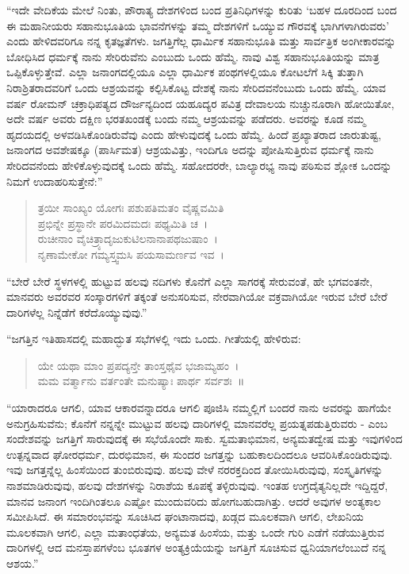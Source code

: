“ಇದೇ ವೇದಿಕೆಯ ಮೇಲೆ ನಿಂತು, ಪೌರಾತ್ಯ ದೇಶಗಳಿಂದ ಬಂದ ಪ್ರತಿನಿಧಿಗಳನ್ನು ಕುರಿತು ‘ಬಹಳ ದೂರದಿಂದ ಬಂದ ಈ ಮಹಾನೀಯರು ಸಹಾನುಭೂತಿಯ ಭಾವನೆಗಳನ್ನು ತಮ್ಮ ದೇಶಗಳಿಗೆ ಒಯ್ಯುವ ಗೌರವಕ್ಕೆ ಭಾಗಿಗಳಾಗಿರುವರು’ ಎಂದು ಹೇಳಿದವರಿಗೂ ನನ್ನ ಕೃತಜ್ಞತೆಗಳು. ಜಗತ್ತಿಗೆಲ್ಲ ಧಾರ್ಮಿಕ ಸಹಾನುಭೂತಿ ಮತ್ತು ಸಾರ್ವತ್ರಿಕ ಅಂಗೀಕಾರವನ್ನು ಬೋಧಿಸಿದ ಧರ್ಮಕ್ಕೆ ನಾನು ಸೇರಿರುವೆನು ಎಂಬುದು ಒಂದು ಹೆಮ್ಮೆ. ನಾವು ವಿಶ್ವ ಸಹಾನುಭೂತಿಯನ್ನು ಮಾತ್ರ ಒಪ್ಪಿಕೊಳ್ಳುತ್ತೇವೆ. ಎಲ್ಲಾ ಜನಾಂಗದಲ್ಲಿಯೂ ಎಲ್ಲಾ ಧಾರ್ಮಿಕ ಪಂಥಗಳಲ್ಲಿಯೂ ಕೋಟಲೆಗೆ ಸಿಕ್ಕಿ ತುತ್ತಾಗಿ ನಿರಾಶ್ರಿತರಾದವರಿಗೆ ಒಂದು ಆಶ್ರಯವನ್ನು ಕಲ್ಪಿಸಿಕೊಟ್ಟ ದೇಶಕ್ಕೆ ನಾನು ಸೇರಿದವನೆಂಬುದು ಒಂದು ಹೆಮ್ಮೆ. ಯಾವ ವರ್ಷ ರೋಮನ್ ಚಕ್ರಾಧಿಪತ್ಯದ ದೌರ್ಜನ್ಯದಿಂದ ಯಹೂದ್ಯರ ಪವಿತ್ರ ದೇವಾಲಯ ನುಚ್ಚುನೂರಾಗಿ ಹೋಯಿತೋ, ಅದೇ ವರ್ಷ ಅವರು ದಕ್ಷಿಣ ಭರತಖಂಡಕ್ಕೆ ಬಂದು ನಮ್ಮ ಆಶ್ರಯವನ್ನು ಪಡೆದರು. ಅವರನ್ನು ಕೂಡ ನಮ್ಮ ಹೃದಯದಲ್ಲಿ ಅಳವಡಿಸಿಕೊಂಡಿರುವೆವು ಎಂದು ಹೇಳುವುದಕ್ಕೆ ಒಂದು ಹೆಮ್ಮೆ. ಹಿಂದೆ ಪ್ರಖ್ಯಾತರಾದ ಜಾರುತುಷ್ಟ, ಜನಾಂಗದ ಅವಶೇಷಕ್ಕೂ (ಪಾರ್ಸಿಮತ) ಆಶ್ರಯವಿತ್ತು, ಇಂದಿಗೂ ಅದನ್ನು ಪೋಷಿಸುತ್ತಿರುವ ಧರ್ಮಕ್ಕೆ ನಾನು ಸೇರಿದವನೆಂದು ಹೇಳಿಕೊಳ್ಳುವುದಕ್ಕೆ ಒಂದು ಹೆಮ್ಮೆ. ಸಹೋದರರೇ, ಬಾಲ್ಯಾರಭ್ಯ ನಾವು ಪಠಿಸುವ ಶ್ಲೋಕ ಒಂದನ್ನು ನಿಮಗೆ ಉದಾಹರಿಸುತ್ತೇನೆ:”

\begin{verse}
ತ್ರಯೀ ಸಾಂಖ್ಯಂ ಯೋಗಃ ಪಶುಪತಿಮತಂ ವೈಷ್ಣವಮಿತಿ\\ಪ್ರಭಿನ್ನೇ ಪ್ರಸ್ಥಾನೇ ಪರಮಿದಮದಃ ಪಥ್ಯಮಿತಿ ಚ~।\\ರುಚೀನಾಂ ವೈಚಿತ್ರ್ಯಾದೃಜುಕುಟಿಲನಾನಾಪಥಜುಷಾಂ~।\\ನೃಣಾಮೇಕೋ ಗಮ್ಯಸ್ತ್ವಮಸಿ ಪಯಸಾಮರ್ಣವ ಇವ~।
\end{verse}

“ಬೇರೆ ಬೇರೆ ಸ್ಥಳಗಳಲ್ಲಿ ಹುಟ್ಟುವ ಹಲವು ನದಿಗಳು ಕೊನೆಗೆ ಎಲ್ಲಾ ಸಾಗರಕ್ಕೆ ಸೇರುವಂತೆ, ಹೇ ಭಗವಂತನೇ, ಮಾನವರು ಅವರವರ ಸಂಸ್ಕಾರಗಳಿಗೆ ತಕ್ಕಂತೆ ಅನುಸರಿಸುವ, ನೇರವಾಗಿಯೋ ವಕ್ರವಾಗಿಯೋ ಇರುವ ಬೇರೆ ಬೇರೆ ದಾರಿಗಳೆಲ್ಲ ನಿನ್ನೆಡೆಗೆ ಕರೆದೊಯ್ಯುವುವು.” 

 “ಜಗತ್ತಿನ ಇತಿಹಾಸದಲ್ಲಿ ಮಹಾದ್ಭುತ ಸಭೆಗಳಲ್ಲಿ ಇದು ಒಂದು. ಗೀತೆಯಲ್ಲಿ ಹೇಳಿರುವ:

\begin{verse}
ಯೇ ಯಥಾ ಮಾಂ ಪ್ರಪದ್ಯನ್ತೇ ತಾಂಸ್ತಥೈವ ಭಜಾಮ್ಯಹಂ~।\\ಮಮ ವರ್ತ್ಮಾನು ವರ್ತಂತೇ ಮನುಷ್ಯಾಃ ಪಾರ್ಥ ಸರ್ವಶಃ~॥
\end{verse}

“ಯಾರಾದರೂ ಆಗಲಿ, ಯಾವ ಆಕಾರವನ್ನಾದರೂ ಆಗಲಿ ಪೂಜಿಸಿ ನಮ್ಮಲ್ಲಿಗೆ ಬಂದರೆ ನಾನು ಅವರನ್ನು ಹಾಗೆಯೇ ಅನುಗ್ರಹಿಸುವೆನು; ಕೊನೆಗೆ ನನ್ನನ್ನೇ ಮುಟ್ಟುವ ಹಲವು ದಾರಿಗಳಲ್ಲಿ ಮಾನವರೆಲ್ಲ ಪ್ರಯತ್ನಪಡುತ್ತಿರುವರು - ಎಂಬ ಸಂದೇಶವನ್ನು ಜಗತ್ತಿಗೆ ಸಾರುವುದಕ್ಕೆ ಈ ಸಭೆಯೊಂದೇ ಸಾಕು. ಸ್ವಮತಾಭಿಮಾನ, ಅನ್ಯಮತದ್ವೇಷ ಮತ್ತು ಇವುಗಳಿಂದ ಉತ್ಪನ್ನವಾದ ಘೋರಧರ್ಮ, ದುರಭಿಮಾನ, ಈ ಸುಂದರ ಜಗತ್ತನ್ನು ಬಹುಕಾಲದಿಂದಲೂ ಆವರಿಸಿಕೊಂಡಿರುವುವು. ಇವು ಜಗತ್ತನ್ನೆಲ್ಲ ಹಿಂಸೆಯಿಂದ ತುಂಬಿರುವುವು. ಹಲವು ವೇಳೆ ನರರಕ್ತದಿಂದ ತೋಯಿಸಿರುವುವು, ಸಂಸ್ಕೃತಿಗಳನ್ನು ನಾಶಮಾಡಿರುವುವು, ಹಲವು ದೇಶಗಳನ್ನು ನಿರಾಶೆಯ ಕೂಪಕ್ಕೆ ತಳ್ಳಿರುವುವು. ಇಂತಹ ಉಗ್ರದೈತ್ಯನಿಲ್ಲದೇ ಇದ್ದಿದ್ದರೆ, ಮಾನವ ಜನಾಂಗ ಇಂದಿಗಿಂತಲೂ ಎಷ್ಟೋ ಮುಂದುವರಿದು ಹೋಗಬಹುದಾಗಿತ್ತು. ಆದರೆ ಅವುಗಳ ಅಂತ್ಯಕಾಲ ಸಮೀಪಿಸಿದೆ. ಈ ಸಮಾರಂಭವನ್ನು ಸೂಚಿಸಿದ ಘಂಟಾನಾದವು, ಖಡ್ಗದ ಮೂಲಕವಾಗಿ ಆಗಲಿ, ಲೇಖನಿಯ ಮೂಲಕವಾಗಿ ಆಗಲಿ, ಎಲ್ಲಾ ಮತಾಂಧತೆಯ, ಅನ್ಯಮತ ಹಿಂಸೆಯ, ಮತ್ತು ಒಂದೇ ಗುರಿ ಎಡೆಗೆ ನಡೆಯುತ್ತಿರುವ ದಾರಿಗಳಲ್ಲಿ ಆದ ಮನಸ್ತಾಪಗಳೆಂಬ ಭೂತಗಳ ಅಂತ್ಯಕ್ರಿಯೆಯನ್ನು ಜಗತ್ತಿಗೆ ಸೂಚಿಸುವ ಧ್ವನಿಯಾಗಲೆಂಬುದೆ ನನ್ನ ಆಶಯ.” 

